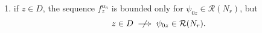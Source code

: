 \documentclass[10pt,xcolor={dvipsnames}]{beamer}
\theoremstyle{plain}
\theoremstyle{plain}
\let\phi\varphi
\begin{document}
\begin{frame}
\begin{corollary}
\begin{enumerate}
 \item if $z \in D$, 
the sequence $f_z^{\alpha_n}$ is bounded only for $\psi_{0z}\in\mathcal{R}({N_r})$, but 
$$
z\in D \centernot\implies \psi_{0z}\in\mathcal{R}({N_r}).
$$
\end{enumerate}
\end{corollary}

\end{frame}
\end{document}
